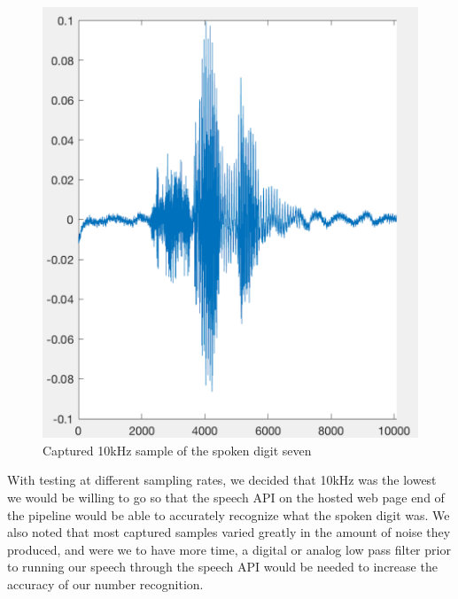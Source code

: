 \begin{figure}[h]
	\caption{Captured 10kHz sample of the spoken digit seven}\label{fig:speechseven}
	\begin{center}
		\includegraphics[scale=0.5]{speech_seven}
	\end{center}
\end{figure}

With testing at different sampling rates, we decided that 10kHz was the lowest we would be willing to go so that the speech API on the hosted web page end of the pipeline would be able to accurately recognize what the spoken digit was. We also noted that most captured samples varied greatly in the amount of noise they produced, and were we to have more time, a digital or analog low pass filter prior to running our speech through the speech API would be needed to increase the accuracy of our number recognition.


